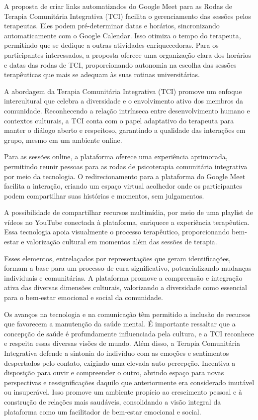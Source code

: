 A proposta de criar links automatizados do Google Meet para as Rodas de Terapia Comunitária Integrativa (TCI) facilita o gerenciamento das sessões pelos terapeutas. Eles podem pré-determinar datas e horários, sincronizando automaticamente com o Google Calendar. Isso otimiza o tempo do terapeuta, permitindo que se dedique a outras atividades enriquecedoras. Para os participantes interessados, a proposta oferece uma organização clara dos horários e datas das rodas de TCI, proporcionando autonomia na escolha das sessões terapêuticas que mais se adequam às suas rotinas universitárias.

A abordagem da Terapia Comunitária Integrativa (TCI) promove um enfoque intercultural que celebra a diversidade e o envolvimento ativo dos membros da comunidade. Reconhecendo a relação intrínseca entre desenvolvimento humano e contextos culturais, a TCI conta com o papel adaptativo do terapeuta para manter o diálogo aberto e respeitoso, garantindo a qualidade das interações em grupo, mesmo em um ambiente online.

Para as sessões online, a plataforma oferece uma experiência aprimorada, permitindo reunir pessoas para as rodas de psicoterapia comunitária integrativa por meio da tecnologia. O redirecionamento para a plataforma do Google Meet facilita a interação, criando um espaço virtual acolhedor onde os participantes podem compartilhar suas histórias e momentos, sem julgamentos.

A possibilidade de compartilhar recursos multimídia, por meio de uma playlist de vídeos no YouTube conectada à plataforma, enriquece a experiência terapêutica. Essa tecnologia apoia visualmente o processo terapêutico, proporcionando bem-estar e valorização cultural em momentos além das sessões de terapia.

Esses elementos, entrelaçados por representações que geram identificações, formam a base para um processo de cura significativo, potencializando mudanças individuais e comunitárias. A plataforma promove a compreensão e integração ativa das diversas dimensões culturais, valorizando a diversidade como essencial para o bem-estar emocional e social da comunidade.

Os avanços na tecnologia e na comunicação têm permitido a inclusão de recursos que favorecem a manutenção da saúde mental. É importante ressaltar que a concepção de saúde é profundamente influenciada pela cultura, e a TCI reconhece e respeita essas diversas visões de mundo. Além disso, a Terapia Comunitária Integrativa defende a sintonia do indivíduo com as emoções e sentimentos despertados pelo contato, exigindo uma elevada auto-percepção. Incentiva a disposição para ouvir e compreender o outro, abrindo espaço para novas perspectivas e ressignificações daquilo que anteriormente era considerado imutável ou insuperável. Isso promove um ambiente propício ao crescimento pessoal e à construção de relações mais saudáveis, consolidando a visão integral da plataforma como um facilitador de bem-estar emocional e social.


